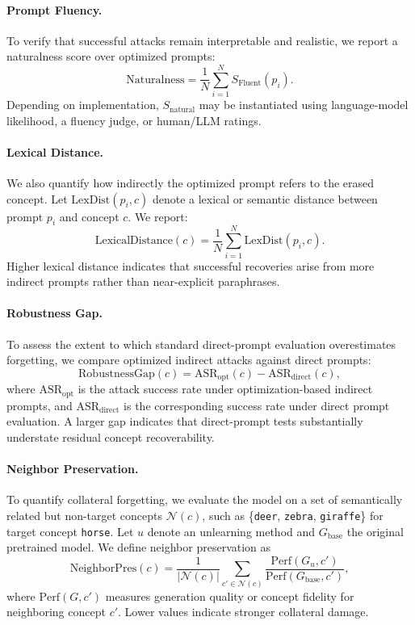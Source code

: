 \paragraph{Prompt Fluency.}
To verify that successful attacks remain interpretable and realistic, we report a naturalness score over optimized prompts:
\begin{equation}
\mathrm{Naturalness} = \frac{1}{N} \sum_{i=1}^{N} S_{\mathrm{Fluent}}(p_i).
\end{equation}
Depending on implementation, $S_{\mathrm{natural}}$ may be instantiated using language-model likelihood, a fluency judge, or human/LLM ratings.

\paragraph{Lexical Distance.}
We also quantify how indirectly the optimized prompt refers to the erased concept. Let $\mathrm{LexDist}(p_i, c)$ denote a lexical or semantic distance between prompt $p_i$ and concept $c$. We report:
\begin{equation}
\mathrm{LexicalDistance}(c) = \frac{1}{N} \sum_{i=1}^{N} \mathrm{LexDist}(p_i, c).
\end{equation}
Higher lexical distance indicates that successful recoveries arise from more indirect prompts rather than near-explicit paraphrases.

\paragraph{Robustness Gap.}
To assess the extent to which standard direct-prompt evaluation overestimates forgetting, we compare optimized indirect attacks against direct prompts:
\begin{equation}
\mathrm{RobustnessGap}(c)
=
\mathrm{ASR}_{\mathrm{opt}}(c)
-
\mathrm{ASR}_{\mathrm{direct}}(c),
\end{equation}
where $\mathrm{ASR}_{\mathrm{opt}}$ is the attack success rate under optimization-based indirect prompts, and $\mathrm{ASR}_{\mathrm{direct}}$ is the corresponding success rate under direct prompt evaluation. A larger gap indicates that direct-prompt tests substantially understate residual concept recoverability.

\paragraph{Neighbor Preservation.}
To quantify collateral forgetting, we evaluate the model on a set of semantically related but non-target concepts $\mathcal{N}(c)$, such as \{\texttt{deer}, \texttt{zebra}, \texttt{giraffe}\} for target concept \texttt{horse}. Let $u$ denote an unlearning method and $G_{\mathrm{base}}$ the original pretrained model. We define neighbor preservation as
\begin{equation}
\mathrm{NeighborPres}(c)
=
\frac{1}{|\mathcal{N}(c)|}
\sum_{c' \in \mathcal{N}(c)}
\frac{\mathrm{Perf}(G_u, c')}{\mathrm{Perf}(G_{\mathrm{base}}, c')},
\end{equation}
where $\mathrm{Perf}(G, c')$ measures generation quality or concept fidelity for neighboring concept $c'$. Lower values indicate stronger collateral damage.

